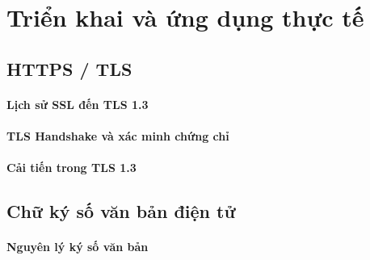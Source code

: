 \chapter{Triển khai và ứng dụng thực tế}
\label{chap:deploy}


\section{HTTPS / TLS}
\label{sec:5.1}

\subsubsection*{Lịch sử SSL đến TLS 1.3}

\subsubsection*{TLS Handshake và xác minh chứng chỉ}

\subsubsection*{Cải tiến trong TLS 1.3}

\section{Chữ ký số văn bản điện tử}
\label{sec:5.2}

\subsubsection*{Nguyên lý ký số văn bản}

